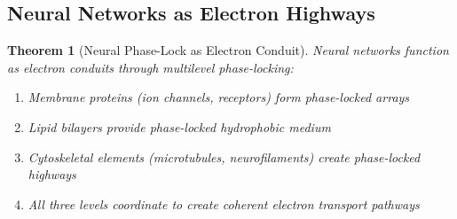 \documentclass[12pt,a4paper]{article}
\newtheorem{theorem}{Theorem}
\begin{document}
\subsection{Neural Networks as Electron Highways}

\begin{theorem}[Neural Phase-Lock as Electron Conduit]
\label{thm:neural_electron_conduit}
Neural networks function as electron conduits through multilevel phase-locking:
\begin{enumerate}
\item Membrane proteins (ion channels, receptors) form phase-locked arrays
\item Lipid bilayers provide phase-locked hydrophobic medium
\item Cytoskeletal elements (microtubules, neurofilaments) create phase-locked highways
\item All three levels coordinate to create coherent electron transport pathways
\end{enumerate}
\end{theorem}
\end{document}
